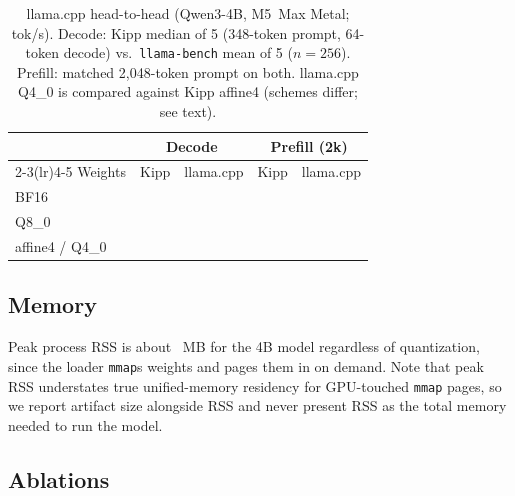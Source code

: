 \documentclass[sigconf,nonacm,screen]{acmart}
\newcommand{\code}[1]{\texttt{\small #1}}
\begin{document}
\begin{table}[t]\centering\small
\caption{llama.cpp head-to-head (Qwen3-4B, M5~Max Metal; tok/s). Decode:
Kipp median of 5 (348-token prompt, 64-token decode) vs.\
\code{llama-bench} mean of 5 ($n{=}256$). Prefill: matched 2{,}048-token
prompt on both. llama.cpp Q4\_0 is compared against Kipp affine4 (schemes
differ; see text).}
\label{tab:llamacpp}
\begin{tabular}{lrrrr}
\toprule
& \multicolumn{2}{c}{Decode} & \multicolumn{2}{c}{Prefill (2k)} \\
\cmidrule(lr){2-3}\cmidrule(lr){4-5}
Weights & Kipp & llama.cpp & Kipp & llama.cpp \\
\midrule
BF16    & \textbf{\DecodeBF} & \LlamaDecodeBF & \PrefillTwoKBF & \textbf{\LlamaPrefillBF} \\
Q8\_0   & \textbf{\DecodeQEight} & \LlamaDecodeQEight & \PrefillTwoKQEight & \textbf{\LlamaPrefillQEight} \\
affine4 / Q4\_0 & \textbf{\DecodeAffineFour} & \LlamaDecodeQFour & \PrefillTwoKAffine & \textbf{\LlamaPrefillQFour} \\
\bottomrule
\end{tabular}
\end{table}

\subsection{Memory}
\label{sec:eval-memory}
Peak process RSS is about \PeakRSS~MB for the 4B model regardless of
quantization, since the loader \code{mmap}s weights and pages them in on
demand. Note that peak RSS understates true unified-memory residency for
GPU-touched \code{mmap} pages, so we report artifact size alongside RSS and
never present RSS as the total memory needed to run the model.

\subsection{Ablations}
\label{sec:eval-ablation}
\end{document}
